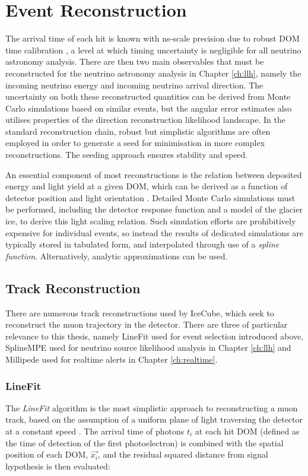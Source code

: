\section{Event Reconstruction}
\label{sec:reco}

The arrival time of each hit is known with ns-scale precision due to robust DOM time calibration \cite{icecube_detector_17}, a level at which timing uncertainty is negligible for all neutrino astronomy analysis. There are then two main observables that must be reconstructed for the neutrino astronomy analysis in Chapter \ref{ch:llh}, namely the incoming neutrino energy and incoming neutrino arrival direction. The uncertainty on both these reconstructed quantities can be derived from Monte Carlo simulations based on similar events, but the angular error estimates also utilises properties of the direction reconstruction likelihood landscape. In the standard reconstruction chain, robust but simplistic algorithms are often employed in order to generate a seed for minimisation in more complex reconstructions. The seeding approach ensures stability and speed. 

An essential component of most reconstructions is the relation between deposited energy and light yield at a given DOM, which can be derived as a function of detector position and light orientation \cite{ic_energy_reco_14}. Detailed Monte Carlo simulations must be performed, including the detector response function and a model of the glacier ice, to derive this light scaling relation. Such simulation efforts are prohibitively expensive for individual events, so instead the results of dedicated simulations are typically stored in tabulated form, and interpolated through use of a \emph{spline function}. Alternatively, analytic approximations can be used.

\subsection*{Track Reconstruction}

There are numerous track reconstructions used by IceCube, which seek to reconstruct the muon trajectory in the detector. There are three of particular relevance to this thesis, namely LineFit used for event selection introduced above, SplineMPE used for neutrino source likelihood analysis in Chapter \ref{ch:llh} and Millipede used for realtime alerts in Chapter \ref{ch:realtime}. 

\subsubsection*{LineFit}
The \emph{LineFit} algorithm is the most simplistic approach to reconstructing a muon track, based on the assumption of a uniform plane of light traversing the detector at a constant speed . The arrival time of photons $t_{i}$ at each hit DOM (defined as the time of detection of the first photoelectron) is combined with the spatial position of each DOM, $\vec{x_{i}}$, and the residual squared distance from signal hypothesis is then evaluated:

